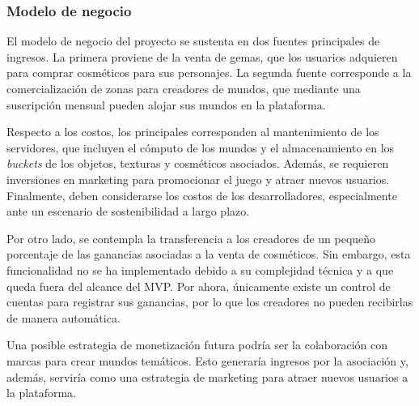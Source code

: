 \subsubsection{Modelo de negocio}
\label{sec:business-model}

El modelo de negocio del proyecto se sustenta en dos fuentes principales de ingresos. 
La primera proviene de la venta de gemas, que los usuarios adquieren para comprar cosméticos para sus personajes. 
La segunda fuente corresponde
a la comercialización de zonas para creadores de mundos, que mediante una suscripción mensual pueden alojar sus mundos en la plataforma.

\vspace{0.25cm}

Respecto a los costos, los principales corresponden al mantenimiento de los servidores, que incluyen el cómputo de los
mundos y el almacenamiento en los \textit{buckets} de los objetos, texturas y cosméticos asociados. Además, se requieren
inversiones en marketing para promocionar el juego y atraer nuevos usuarios. Finalmente, deben considerarse los costos de los 
desarrolladores, especialmente ante un escenario de sostenibilidad a largo plazo.

\vspace{0.25cm}

Por otro lado, se contempla la transferencia a los creadores de un pequeño porcentaje de las ganancias asociadas a la
venta de cosméticos. Sin embargo, esta funcionalidad no se ha implementado debido a su complejidad técnica y a que
queda fuera del alcance del MVP. Por ahora, únicamente existe un control de cuentas para registrar sus ganancias, por
lo que los creadores no pueden recibirlas de manera automática. 

\vspace{0.25cm}

Una posible estrategia de monetización futura podría ser la colaboración con marcas para crear mundos temáticos. Esto 
generaría ingresos por la asociación y, además, serviría como una estrategia de marketing para atraer nuevos usuarios 
a la plataforma.
